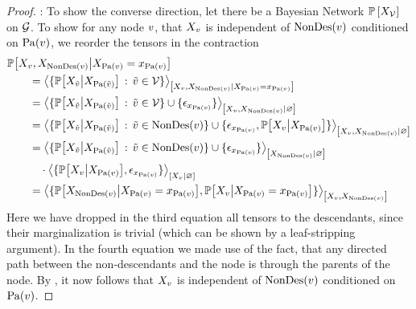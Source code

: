 \begin{proof}
    \proofleftsymbol:
    To show the converse direction, let there be a Bayesian Network $\mathbb{P}\left[X_{\mathcal{V}}\right]$ on $\mathcal{G}$.
    To show for any node $v$, that $X_{v}$ is independent of $\mathrm{NonDes}(v)$ conditioned on $\mathrm{Pa}(v)$, we reorder the tensors in the contraction
    \begin{align*}
        & \condprobof{\catvariableof{\node},\catvariableof{\nondescendantsof{\node}}}{\indexedcatvariableof{\parentsof{\node}}} \\
        & \quad\quad = \normalizationofwrt{
            \{\condprobof{\catvariableof{\secnode}}{\catvariableof{\parentsof{\secnode}}} \wcols\secnode\in\nodes\}
        }
        {\catvariableof{\node},\catvariableof{\nondescendantsof{\node}}}
        {\indexedcatvariableof{\parentsof{\node}}} \\
        & \quad\quad  = \normalizationof{
            \{\condprobof{\catvariableof{\secnode}}{\catvariableof{\parentsof{\secnode}}} \wcols\secnode\in\nodes\} \cup \{\onehotmapof{\catindexof{\parentsof{\node}}}\}
        }
        {\catvariableof{\node},\catvariableof{\nondescendantsof{\node}}}\\
        &  \quad\quad = \normalizationof{
            \{\condprobof{\catvariableof{\secnode}}{\catvariableof{\parentsof{\secnode}}} \wcols\secnode\in\nondescendantsof{\node}\} \cup \{\onehotmapof{\catindexof{\parentsof{\node}}}, \condprobof{\catvariableof{\node}}{\catvariableof{\parentsof{\node}}} \}
        }
        {\catvariableof{\node},\catvariableof{\nondescendantsof{\node}}} \\
        &  \quad\quad =  %
        \normalizationof{
            \{\condprobof{\catvariableof{\secnode}}{\catvariableof{\parentsof{\secnode}}} \wcols\secnode\in\nondescendantsof{\node}\} \cup \{\onehotmapof{\catindexof{\parentsof{\node}}}\}
        }
        {\catvariableof{\nondescendantsof{\node}}} \\
        & \quad\quad  \quad  \cdot \normalizationof{
            \{\condprobof{\catvariableof{\node}}{\catvariableof{\parentsof{\node}}},\onehotmapof{\catindexof{\parentsof{\node}}}\}
        }
        {\catvariableof{\node}} \\
        & \quad\quad  = \contractionof{\{
            \condprobof{\catvariableof{\nondescendantsof{\node}}}{\indexedcatvariableof{\parentsof{\node}}},
            \condprobof{\catvariableof{\node}}{\indexedcatvariableof{\parentsof{\node}}}
            \}}{\catvariableof{\node},\catvariableof{\nondescendantsof{\node}}}
    \end{align*}
    Here we have dropped in the third equation all tensors to the descendants, since their marginalization is trivial (which can be shown by a leaf-stripping argument).
    In the fourth equation we made use of the fact, that any directed path between the non-descendants and the node is through the parents of the node.
    By , it now follows that $X_{v}$ is independent of $\mathrm{NonDes}(v)$ conditioned on $\mathrm{Pa}(v)$.
\end{proof}

